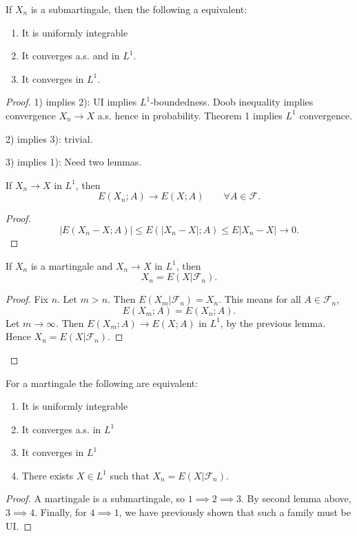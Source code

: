 \begin{theorem}
	If $X_n$ is a submartingale, then the following a equivalent:
	\begin{enumerate}
		\item It is uniformly integrable
		\item It converges a.s. and in $L^1$.
		\item It converges in $L^1$.
	\end{enumerate}
\end{theorem}
\begin{proof}
	1) implies 2): UI implies  $L^1$-boundedness. Doob inequality implies convergence  $X_n \to X$ a.s. hence in probability. Theorem 1 implies $L^1$ convergence.
	
	2) implies 3): trivial.

	3) implies 1): Need two lemmas.

	\begin{lemma}
		If $X_n \to  X$ in $L^1$, then
		\[
			E(X_n ; A) \to  E(X ; A) \qquad \forall  A \in \mathcal{F}
		.\] 
	\end{lemma}
	\begin{proof}
		\[
			\left| E(X_n - X; A) \right| 
			\le E\left( \left| X_n - X \right| ;A  \right) 
			\le E |X_n - X| \to  0
		.\] 
	\end{proof}
	\begin{lemma}
		\label{lem:mart-lemma}
		If $X_n $ is a martingale and $X_n \to  X$ in $L^1$, then 
		\[
			X_n = E(X | \mathcal{F}_n)
		.\] 
	\end{lemma}
	\begin{proof}
		Fix $n$. Let $m > n$. Then $E(X_m | \mathcal{F}_n) = X_n$.
		This means for all $ A \in \mathcal{F}_n$,
		\[
			E(X_m ; A) = E(X_n ; A)
		.\] 
		Let $ m\to \infty $. Then $E(X_m ; A) \to E(X;A)$ in $L^1$, by the previous lemma. Hence $X_n = E(X | \mathcal{F}_n)$.
	\end{proof}
	

\end{proof}

\begin{theorem}
	For a martingale the following are equivalent:
	\begin{enumerate}
		\item It is uniformly integrable
		\item It converges a.s. in $L^1$
		\item It converges in $L^1$ 
		\item There exists $X \in L^1$ such that $X_n = E(X | \mathcal{F}_n)$.
	\end{enumerate}
\end{theorem}
\begin{proof}
	A martingale is a submartingale, so  $1 \implies 2 \implies 3$.
	By second lemma above, $3 \implies 4$.
	Finally, for $4 \implies 1$, we have previously shown that such a family must be UI.
\end{proof}

